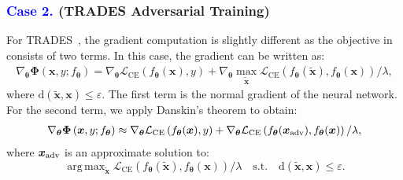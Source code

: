 \documentclass[runningheads]{llncs}
\DeclareMathOperator*{\argmax}{arg\,max}
\begin{document}
\subsubsection{\textcolor{blue}{Case 2.} (TRADES Adversarial Training)}

For TRADES~\cite{zhang2019trades}, the gradient computation is slightly different as the objective in  consists of two terms.
In this case, the gradient can be written as:
\begin{align}\label{eq:nn_gradeint_trades}
\nabla_{\boldsymbol{\theta}}\boldsymbol{\Phi} \left(\boldsymbol{x}, y; f_{\boldsymbol{\theta}}\right) = \nabla_{\boldsymbol{\theta}}\mathcal{L}_{\mathrm{CE}}\left(f_{\boldsymbol{\theta}}(\boldsymbol{x}), y\right) + \nabla_{\boldsymbol{\theta}}\max_{\tilde{\boldsymbol{x}}} \mathcal{L}_{\mathrm{CE}}\left(f_{\boldsymbol{\theta}}(\tilde{\boldsymbol{x}}), f_{\boldsymbol{\theta}}(\boldsymbol{x})\right)/\lambda,
\end{align}
where $\mathrm{d}({\tilde{\boldsymbol{x}}, \boldsymbol{x}})\leq \varepsilon$.
The first term is the normal gradient of the neural network.
For the second term, we apply Danskin's theorem to obtain:
\begin{align}\label{eq:nn_gradeint_trades_penufinal}
    \nabla_{\boldsymbol{\theta}}\boldsymbol{\Phi} \left(\boldsymbol{x}, y; f_{\boldsymbol{\theta}}\right) \approx \nabla_{\boldsymbol{\theta}}\mathcal{L}_{\mathrm{CE}}\left(f_{\boldsymbol{\theta}}(\boldsymbol{x}), y\right) + \nabla_{\boldsymbol{\theta}} \mathcal{L}_{\mathrm{CE}}\left(f_{\boldsymbol{\theta}}(\boldsymbol{x}_{\rm{adv}}), f_{\boldsymbol{\theta}}(\boldsymbol{x})\right)/\lambda,
\end{align}
where $\boldsymbol{x}_{\rm{adv}}$ is an approximate solution to:
\begin{equation}\label{eq:trades_max}
    \argmax_{\tilde{\boldsymbol{x}}} \mathcal{L}_{\mathrm{CE}}\left(f_{\boldsymbol{\theta}}(\tilde{\boldsymbol{x}}), f_{\boldsymbol{\theta}}(\boldsymbol{x})\right)/\lambda \quad \text{s.t.} \quad \mathrm{d}\left({\tilde{\boldsymbol{x}}, \boldsymbol{x}}\right)\leq \varepsilon.
\end{equation}
\end{document}
